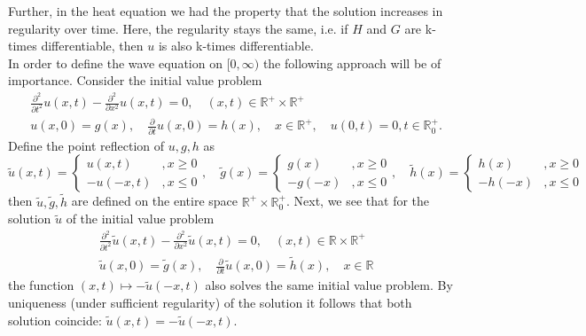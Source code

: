 \documentclass[A4,12pt,twoside]{book}
\begin{document}
Further, in the heat equation we had the property that the solution increases in regularity over time. Here, the regularity stays the same, i.e. if $H$ and $G$ are k-times differentiable, then $u$ is also k-times differentiable.\\

In order to define the wave equation on $[0,\infty)$ the following approach will be of importance. Consider the initial value problem 
\begin{align*}
   & \frac{\partial^2}{\partial t^2} u(x,t) - \frac{\partial^2}{\partial x^2} u(x,t) =0, \quad (x,t) \in \mathbb{R}^+ \times \mathbb{R}^+ \\
    & u(x,0) = g(x), \quad \frac{\partial}{\partial t} u(x,0) = h(x), \quad x \in \mathbb{R}^+ , \quad u(0,t)=0, t \in \mathbb{R}_0^+. 
\end{align*}
Define the point reflection of $u,g,h$ as 
\[
\tilde{u}(x,t)= \begin{cases}
    u(x,t) &, x \geq 0 \\
    -u(-x,t) &, x\leq 0
\end{cases}, \quad \tilde{g}(x)= \begin{cases}
    g(x) &, x \geq 0 \\
    -g(-x) &, x\leq 0
\end{cases}, \quad \tilde{h}(x)= \begin{cases}
    h(x) &, x \geq 0 \\
    -h(-x) &, x\leq 0
\end{cases}
\]
then $\tilde{u}, \tilde{g},\tilde{h}$ are defined on the entire space $\mathbb{R}^+ \times \mathbb{R}_0^+$. Next, we see that for the solution $\tilde{u}$ of the initial value problem 
\begin{align*}
    & \frac{\partial^2}{\partial t^2} \tilde{u}(x,t) - \frac{\partial^2}{\partial x^2} \tilde{u}(x,t) =0, \quad (x,t) \in \mathbb{R} \times \mathbb{R}^+ \\
     & \tilde{u}(x,0) = \tilde{g}(x), \quad \frac{\partial}{\partial t} \tilde{u}(x,0) = \tilde{h}(x), \quad x \in \mathbb{R}
\end{align*}
the function $(x,t) \mapsto -\tilde{u}(-x,t)$ also solves the same initial value problem. By uniqueness (under sufficient regularity) of the solution it follows that both solution coincide: $\tilde{u} (x,t)= - \tilde{u}(-x,t)$.\\
\end{document}
